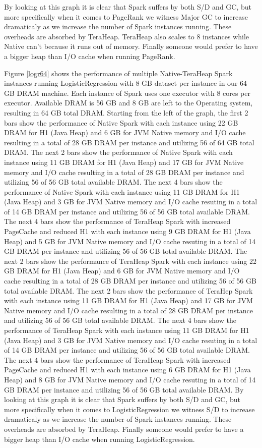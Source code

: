 \documentclass[twocolumn,10pt]{asme2e}
\begin{document}
By looking at this graph it is clear that Spark suffers by both S/D and GC, but more specifically when it comes to PageRank we witness Major GC to increase dramaticaly as we increase the number of Spark instances running. These overheads are absorbed by TeraHeap. TeraHeap also scales to 8 instances while Native can't because it runs out of memory. Finally someone would prefer to have a bigger heap than I/O cache when running PageRank.

Figure \ref{logr64} shows the performance of multiple Native-TeraHeap Spark instances running LogisticRegression with 8 GB dataset per instance in our 64 GB DRAM machine. Each instance of Spark uses one executor with 8 cores per executor. Available DRAM is 56 GB and 8 GB are left to the Operating system, resulting in 64 GB total DRAM. Starting from the left of the graph, the first 2 bars show the performance of Native Spark with each instance using 22 GB DRAM for H1 (Java Heap) and 6 GB for JVM Native memory and I/O cache resulting in a total of 28 GB DRAM per instance and utilizing 56 of 64 GB total DRAM. The next 2 bars show the performance of Native Spark with each instance using 11 GB DRAM for H1 (Java Heap) and 17 GB for JVM Native memory and I/O cache resulting in a total of 28 GB DRAM per instance and utilizing 56 of 56 GB total available DRAM. The next 4 bars show the performance of Native Spark with each instance using 11 GB DRAM for H1 (Java Heap) and 3 GB for JVM Native memory and I/O cache resuting in a total of 14 GB DRAM per instance and utilizing 56 of 56 GB total available DRAM. The next 4 bars show the performance of TeraHeap Spark with increased PageCache and reduced H1 with each instance using 9 GB DRAM for H1 (Java Heap) and 5 GB for JVM Native memory and I/O cache resuting in a total of 14 GB DRAM per instance and utilizing 56 of 56 GB total available DRAM. 
The next 2 bars show the performance of TeraHeap Spark with each instance using 22 GB DRAM for H1 (Java Heap) and 6 GB for JVM Native memory and I/O cache resulting in a total of 28 GB DRAM per instance and utilizing 56 of 56 GB total available DRAM. The next 2 bars show the performance of TeraHep Spark with each instance using 11 GB DRAM for H1 (Java Heap) and 17 GB for JVM Native memory and I/O cache resulting in a total of 28 GB DRAM per instance and utilizing 56 of 56 GB total available DRAM. The next 4 bars show the performance of TeraHeap Spark with each instance using 11 GB DRAM for H1 (Java Heap) and 3 GB for JVM Native memory and I/O cache resuting in a total of 14 GB DRAM per instance and utilizing 56 of 56 GB total available DRAM. The next 4 bars show the performance of TeraHeap Spark with increased PageCache and reduced H1 with each instance using 6 GB DRAM for H1 (Java Heap) and 8 GB for JVM Native memory and I/O cache resuting in a total of 14 GB DRAM per instance and utilizing 56 of 56 GB total available DRAM.  
By looking at this graph it is clear that Spark suffers by both S/D and GC, but more specifically when it comes to LogisticRegression we witness S/D to increase dramaticaly as we increase the number of Spark instances running. These overheads are absorbed by TeraHeap. Finally someone would prefer to have a bigger heap than I/O cache when running LogisticRegression.
\end{document}
